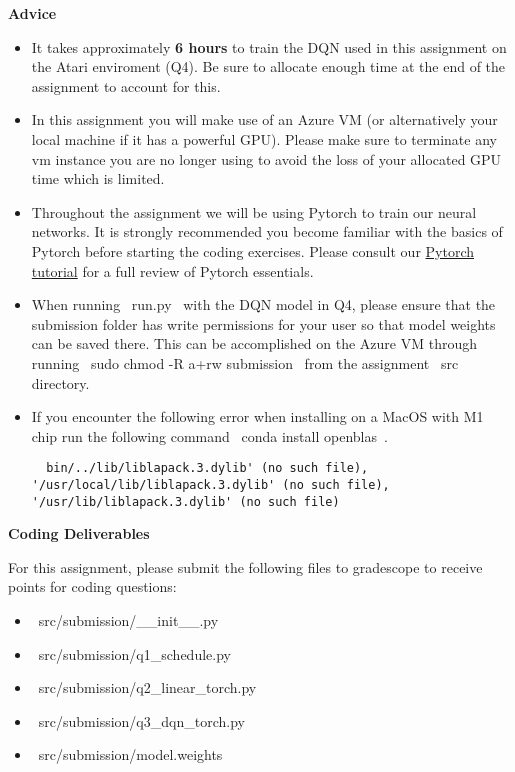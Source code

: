 \textbf{Advice}
\begin{itemize}
  \item It takes approximately \textbf{6 hours} to train the DQN used in this assignment on the Atari enviroment (Q4). Be sure to allocate enough time at the end of the assignment to account for this.

  \item In this assignment you will make use of an Azure VM (or alternatively your local machine if it has a powerful GPU). Please make sure to terminate any vm instance you are no longer using to avoid the loss of your allocated GPU time which is limited.

  \item Throughout the assignment we will be using Pytorch to train our neural networks. It is strongly recommended you become familiar with the basics of Pytorch before starting the coding exercises. Please consult our \href{https://colab.research.google.com/drive/1BZ89PnXpzN2US_OxwuQCazucmuTpuIfS?usp=sharing}{Pytorch tutorial} for a full review of Pytorch essentials.

  \item When running ~run.py~ with the DQN model in Q4, please ensure that the submission folder has write permissions for your user so that model weights can be saved there. This can be accomplished on the Azure VM through running ~sudo chmod -R a+rw submission~ from the assignment ~src~ directory.

  \item If you encounter the following error when installing on a MacOS with M1 chip run the following command ~conda install openblas~.

  \begin{lstlisting}
  bin/../lib/liblapack.3.dylib' (no such file), '/usr/local/lib/liblapack.3.dylib' (no such file), '/usr/lib/liblapack.3.dylib' (no such file)
  \end{lstlisting}
\end{itemize}


\textbf{Coding Deliverables}

For this assignment, please submit the following files to gradescope to receive points for coding questions:
\begin{itemize}
    \item ~src/submission/__init__.py~
    \item ~src/submission/q1_schedule.py~
    \item ~src/submission/q2_linear_torch.py~
    \item ~src/submission/q3_dqn_torch.py~
    \item ~src/submission/model.weights~
\end{itemize}
